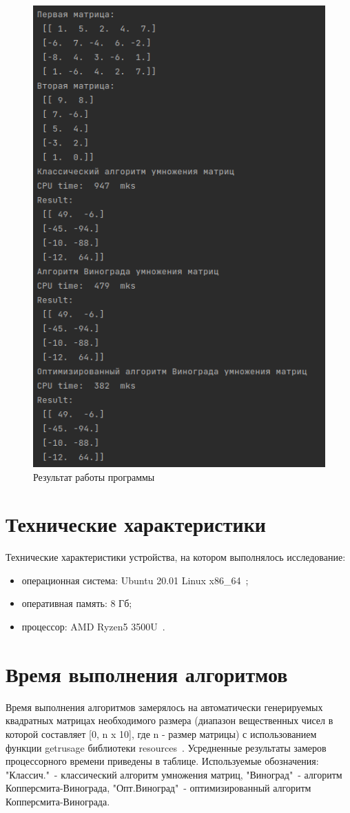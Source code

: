 \documentclass[a4paper,oneside,14pt]{extreport}
\begin{document}
\begin{figure}[H]
	\centering
	\includegraphics[width=0.7\linewidth]{images/example2}
	\caption{Результат работы программы}
	\label{fig:work_example2}
\end{figure}

\section{Технические характеристики}
Технические характеристики устройства, на котором выполнялось исследование:
\begin{itemize}
	\item операционная система: Ubuntu 20.01 Linux x86\_64~\cite{ubuntu};
	\item оперативная память: 8 Гб;
	\item процессор: AMD Ryzen5 3500U~\cite{processor}.
\end{itemize}

\section{Время выполнения алгоритмов}
Время выполнения алгоритмов замерялось на автоматически генерируемых квадратных матрицах необходимого размера (диапазон вещественных чисел в которой составляет [0, n x 10], где n - размер матрицы) с использованием функции getrusage библиотеки resources~\cite{resource}. Усредненные результаты замеров процессорного времени приведены в таблице. Используемые обозначения: "Классич."\ - классический алгоритм умножения матриц, "Виноград"\ - алгоритм Копперсмита-Винограда, "Опт.Виноград"\ - оптимизированный алгоритм Копперсмита-Винограда.  
\end{document}

